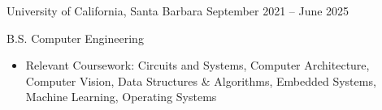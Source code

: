 \documentclass[9pt]{developercv} %
\begin{document}
\vspace{-6 pt}
\vspace{-4 pt}
\begin{entrylist}
    \entry
		{}
		{University of California, Santa Barbara}
		{September 2021 – June 2025}
		{B.S. Computer Engineering
        \vspace{1pt}
        \begin{itemize}[noitemsep,topsep=0pt,parsep=0pt,partopsep=0pt, leftmargin=10pt]
            \item Relevant Coursework: Circuits and Systems, Computer Architecture, Computer Vision, Data Structures \& Algorithms, Embedded Systems, Machine Learning, Operating Systems
        \end{itemize}}
\end{entrylist}
\end{document}
